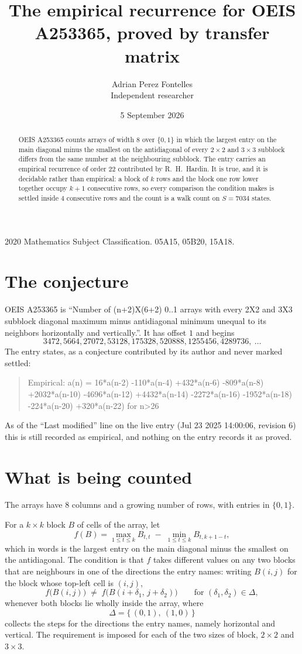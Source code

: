 \documentclass[11pt,a4paper]{article}
\title{The empirical recurrence for OEIS A253365, proved by transfer matrix}
\author{Adrian Perez Fontelles\\ \small Independent researcher}
\date{5 September 2026}
\theoremstyle{plain}
\theoremstyle{definition}
\begin{document}
\maketitle

\begin{abstract}
OEIS A253365 counts arrays of width $8$ over $\{0,1\}$ in which the largest entry on the main diagonal minus the smallest on the antidiagonal of every $2\times2$ and $3\times3$ subblock differs from the same number at the neighbouring subblock. The entry carries an
empirical recurrence of order $22$ contributed by R.~H.~Hardin. It is true, and it is
decidable rather than empirical: a block of $k$ rows and the block one row lower together
occupy $k+1$ consecutive rows, so every comparison the condition makes is settled inside
$4$ consecutive rows and the count is a walk count on $S=7034$ states.
\end{abstract}

\noindent\small 2020 Mathematics Subject Classification. 05A15, 05B20, 15A18.\normalsize

\section{The conjecture}

OEIS A253365 is ``Number of (n+2)X(6+2) 0..1 arrays with every 2X2 and 3X3 subblock diagonal maximum minus antidiagonal minimum unequal to its neighbors horizontally and vertically.''. It has offset $1$ and begins
\[
3472, 5664, 27072, 53128, 175328, 520888, 1255456, 4289736,\ \dots
\]
The entry states, as a conjecture contributed by its author and never marked settled:
\begin{quote}
Empirical: a(n) = 16*a(n-2) -110*a(n-4) +432*a(n-6) -809*a(n-8) +2032*a(n-10) -4696*a(n-12) +4432*a(n-14) -2272*a(n-16) -1952*a(n-18) -224*a(n-20) +320*a(n-22) for n>26
\end{quote}
As of the ``Last modified'' line on the live entry (Jul 23 2025 14:00:06, revision 6) this is still
recorded as empirical, and nothing on the entry records it as proved.

\section{What is being counted}

The arrays have $8$ columns and a growing number of rows, with entries in $\{0,1\}$.

For a $k\times k$ block $B$ of cells of the array, let
\[
f(B)=\max_{1\le t\le k}B_{t,t}\;-\;\min_{1\le t\le k}B_{t,k+1-t} ,
\]
which in words is the largest entry on the main diagonal minus the smallest on the antidiagonal. The condition is that $f$ takes different values on any two blocks that
are neighbours in one of the directions the entry names: writing $B(i,j)$ for the block whose
top-left cell is $(i,j)$,
\[
f\bigl(B(i,j)\bigr)\;\neq\;f\bigl(B(i+\delta_1,\,j+\delta_2)\bigr)
\qquad\text{for }(\delta_1,\delta_2)\in\Delta,
\]
whenever both blocks lie wholly inside the array, where
\[
\Delta=\{\,(0,1),\ (1,0)\,\}
\]
collects the steps for the directions the entry names, namely horizontal and vertical. The
requirement is imposed for each of the two sizes of block, $2\times2$ and $3\times3$.
\end{document}
